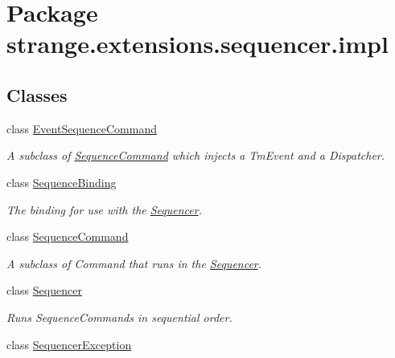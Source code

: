\hypertarget{namespacestrange_1_1extensions_1_1sequencer_1_1impl}{\section{Package strange.\-extensions.\-sequencer.\-impl}
\label{namespacestrange_1_1extensions_1_1sequencer_1_1impl}
}
\subsection*{Classes}
\begin{DoxyCompactItemize}
\item 
class \hyperlink{classstrange_1_1extensions_1_1sequencer_1_1impl_1_1_event_sequence_command}{Event\-Sequence\-Command}
\begin{DoxyCompactList}\small\item\em A subclass of \hyperlink{classstrange_1_1extensions_1_1sequencer_1_1impl_1_1_sequence_command}{Sequence\-Command} which injects a Tm\-Event and a Dispatcher. \end{DoxyCompactList}\item 
class \hyperlink{classstrange_1_1extensions_1_1sequencer_1_1impl_1_1_sequence_binding}{Sequence\-Binding}
\begin{DoxyCompactList}\small\item\em The binding for use with the \hyperlink{classstrange_1_1extensions_1_1sequencer_1_1impl_1_1_sequencer}{Sequencer}. \end{DoxyCompactList}\item 
class \hyperlink{classstrange_1_1extensions_1_1sequencer_1_1impl_1_1_sequence_command}{Sequence\-Command}
\begin{DoxyCompactList}\small\item\em A subclass of Command that runs in the \hyperlink{classstrange_1_1extensions_1_1sequencer_1_1impl_1_1_sequencer}{Sequencer}. \end{DoxyCompactList}\item 
class \hyperlink{classstrange_1_1extensions_1_1sequencer_1_1impl_1_1_sequencer}{Sequencer}
\begin{DoxyCompactList}\small\item\em Runs Sequence\-Commands in sequential order. \end{DoxyCompactList}\item 
class \hyperlink{classstrange_1_1extensions_1_1sequencer_1_1impl_1_1_sequencer_exception}{Sequencer\-Exception}

\end{DoxyCompactItemize}
